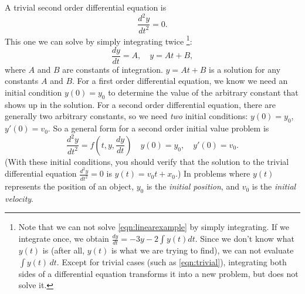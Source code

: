 A trivial second order differential equation is
\begin{equation}
   \frac{d^2y}{dt^2} = 0.
   \label{eqn:trivial}
\end{equation}
This one we can solve by simply integrating twice%
\footnote{Note that we can not solve \eqref{eqn:linearexample}
by simply integrating. If we integrate once, we obtain
$\frac{dy}{dt} = -3y -2\int y(t)dt$.  Since we don't know what
$y(t)$ is (after all, $y(t)$ is what we are trying to find), we can not
evaluate $\int y(t)\,dt$.  Except for trivial cases
(such as \eqref{eqn:trivial}),
integrating both sides of a differential
equation transforms it into a new problem, but does not solve it.}:
\begin{equation}
  \frac{dy}{dt} = A, \quad y = At+B,
\end{equation}
where $A$ and $B$ are constants of integration.
$y=At+B$ is a solution for any constants $A$ and $B$.
For a first order differential equation, we know we need
an initial condition $y(0)=y_0$ to determine the value of the
arbitrary constant that shows up in the solution.  For a second order
differential equation, there are generally two arbitrary constants, so
we need \emph{two} initial conditions: $y(0)=y_0$, $y'(0) = v_0$.
So a general form for a second order initial value problem is
\begin{equation}
   \frac{d^2y}{dt^2} = f\left(t,y,\frac{dy}{dt}\right)
  \quad y(0) = y_0, \quad y'(0)=v_0.
\end{equation}
(With these initial conditions, you should verify that the solution
to the trivial differential equation $\frac{d^2y}{dt^2}=0$ is $y(t)=v_0 t + x_0$.)
In problems where $y(t)$ represents the position of an object,
$y_0$ is the \emph{initial position}, and $v_0$ is the
\emph{initial velocity}.

